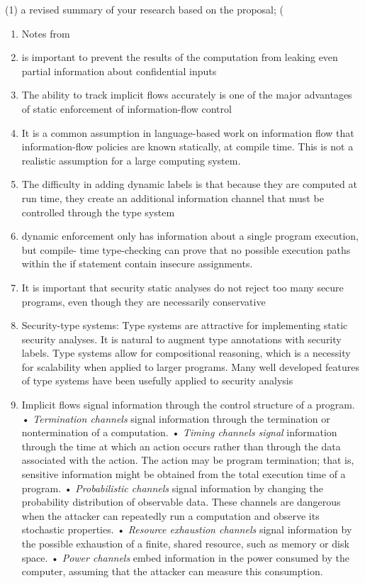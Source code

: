 \documentclass[11pt,letterpaper]{article}
\begin{document}
(1) a revised summary of your research based on the proposal; (
\begin{enumerate}

  \item Notes from \cite{sabelfeld2003language}
  \item is important to prevent the results of the computation from leaking even partial information about confidential inputs

  \item The ability to track implicit flows accurately is one of the major advantages of static enforcement of information-flow control

  \item It is a common assumption in language-based work on information flow that information-flow policies are known statically, at compile time. This is not a realistic assumption for a large computing system.

  \item The difficulty in adding dynamic labels is that because they are computed at run time, they create an additional information channel that must be controlled through the type system

  \item dynamic enforcement only has information about a single program execution, but compile- time type-checking can prove that no possible execution paths within the if statement contain insecure assignments.

  \item It is important that security static analyses do not reject too many secure programs, even though they are necessarily conservative

  \item Security-type systems: Type systems are attractive for implementing static security analyses. It is natural to augment type annotations with security labels. Type systems allow for compositional reasoning, which is a necessity for scalability when applied to larger programs. Many well developed features of type systems have been usefully applied to security analysis
  \item Implicit flows signal information through the control structure of a program.
• \textit{Termination channels} signal information through the termination or nontermination of a computation.
• \textit{Timing channels signal} information through the time at which an action occurs rather than through the data associated with the action. The action may be program termination; that is, sensitive information might be obtained from the total execution time of a program.
• \textit{Probabilistic channels} signal information by changing the probability distribution of observable data. These channels are dangerous when the attacker can repeatedly run a computation and observe its stochastic properties.
• \textit{Resource exhaustion channels} signal information by the possible exhaustion of a finite, shared resource, such as memory or disk space.
• \textit{Power channels} embed information in the power consumed by the computer, assuming that the attacker can measure this consumption.


\end{enumerate}
\end{document}
